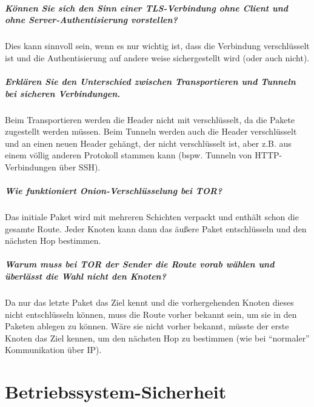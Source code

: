 \documentclass[a4paper, 11pt, accentcolor = tud3b]{tudreport}
\begin{document}
			\paragraph{Können Sie sich den Sinn einer TLS-Verbindung ohne Client und ohne Server-Authentisierung vorstellen?}
			Dies kann sinnvoll sein, wenn es nur wichtig ist, dass die Verbindung verschlüsselt ist und die Authentisierung auf andere weise sichergestellt wird (oder auch nicht).
			
			\paragraph{Erklären Sie den Unterschied zwischen Transportieren und Tunneln bei sicheren Verbindungen.}
			Beim Transportieren werden die Header nicht mit verschlüsselt, da die Pakete zugestellt werden müssen. Beim Tunneln werden auch die Header verschlüsselt und an einen neuen Header gehängt, der nicht verschlüsselt ist, aber z.B. aus einem völlig anderen Protokoll stammen kann (bspw. Tunneln von HTTP-Verbindungen über SSH).
			
			\paragraph{Wie funktioniert Onion-Verschlüsselung bei TOR?}
			Das initiale Paket wird mit mehreren Schichten verpackt und enthält schon die gesamte Route. Jeder Knoten kann dann das äußere Paket entschlüsseln und den nächsten Hop bestimmen.
			
			\paragraph{Warum muss bei TOR der Sender die Route vorab wählen und überlässt die Wahl nicht den Knoten?}
			Da nur das letzte Paket das Ziel kennt und die vorhergehenden Knoten dieses nicht entschlüsseln können, muss die Route vorher bekannt sein, um sie in den Paketen ablegen zu können. Wäre sie nicht vorher bekannt, müsste der erste Knoten das Ziel kennen, um den nächsten Hop zu bestimmen (wie bei \enquote{normaler} Kommunikation über IP).

    \chapter{Betriebssystem-Sicherheit}
\end{document}
